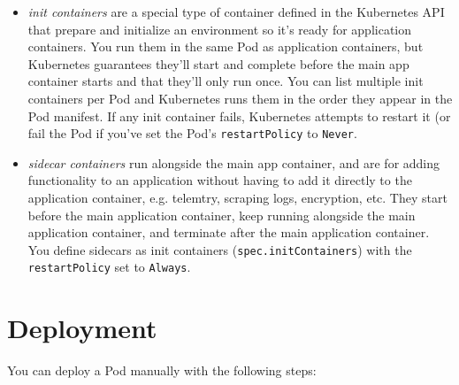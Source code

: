 \documentclass[table, xcdraw]{article}%
\begin{document}
\begin{itemize}
	\item \emph{init containers} are a special type of container defined in the Kubernetes API that prepare and initialize an environment so it’s ready for application containers. You run them in the same Pod as application containers, but Kubernetes guarantees they’ll start and complete before the main app container starts and that they’ll only run once. You can list multiple init containers per Pod and Kubernetes runs them in the order they appear in the Pod manifest. If any init container fails, Kubernetes attempts to restart it (or fail the Pod if you’ve set the Pod’s \texttt{restartPolicy} to \texttt{Never}.
	\item \emph{sidecar containers} run alongside the main app container, and are for adding functionality to an application without having to add it directly to the application container, e.g. telemtry, scraping logs, encryption, etc. They start before the main application container, keep running alongside the main application container, and terminate after the main application container. You define sidecars as init containers (\texttt{spec.initContainers}) with the \texttt{restartPolicy} set to \texttt{Always}. 
\end{itemize}

\section{Deployment}

You can deploy a Pod manually with the following steps:
\end{document}
